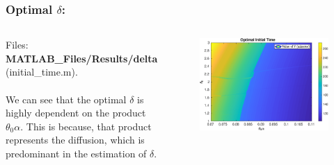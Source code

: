 \documentclass[aspectratio=169]{beamer}\usepackage[utf8]{inputenc}
\begin{document}
\begin{frame}\frametitle{Optimal $\delta$:}

\begin{columns}

Files: \textbf{MATLAB\_Files/Results/delta} (initial\_time.m).\\
\quad\\
We can see that the optimal $\delta$ is highly dependent on the product $\theta_0\alpha$. This is because, that product represents the diffusion, which is predominant in the estimation of $\delta$.

\begin{figure}[ht!]
\centering
\includegraphics[width=1\textwidth]{../../MATLAB_Files/Results/delta/contour_delta.eps}
\end{figure}

\end{columns}

\end{frame}

\end{document}
